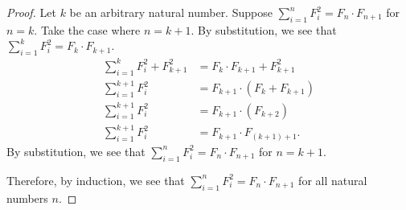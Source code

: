 \documentclass{amsart}
\numberwithin{equation}{section}
\begin{document}
\begin{problem}[manual-num=62]
\begin{proof}
			Let $k$ be an arbitrary natural number. Suppose $\sum_{i = 1}^{n} F_i^2 = F_n \cdot F_{n + 1}$ for $n = k$.
			Take the case where $n = k + 1$.
			By substitution, we see that $\sum_{i = 1}^{k} F_i^2 = F_k \cdot F_{k + 1}$.
			\begin{align*}
				\sum_{i = 1}^{k} F_i^2 + F_{k + 1}^2 &= F_k \cdot F_{k + 1} + F_{k + 1}^2 \\
				\sum_{i = 1}^{k + 1} F_i^2 &= F_{k + 1} \cdot (F_k + F_{k + 1})\\
				\sum_{i = 1}^{k + 1} F_i^2 &= F_{k + 1} \cdot (F_{k + 2})\\
				\sum_{i = 1}^{k + 1} F_i^2 &= F_{k + 1} \cdot F_{(k + 1) + 1}.
			\end{align*}
			By substitution, we see that $\sum_{i = 1}^{n} F_i^2 = F_n \cdot F_{n + 1}$ for $n = k + 1$.

			Therefore, by induction, we see that $\sum_{i = 1}^{n} F_i^2 = F_n \cdot F_{n + 1}$ for all natural numbers $n$.
		\end{proof}
	\end{problem}
\end{document}
